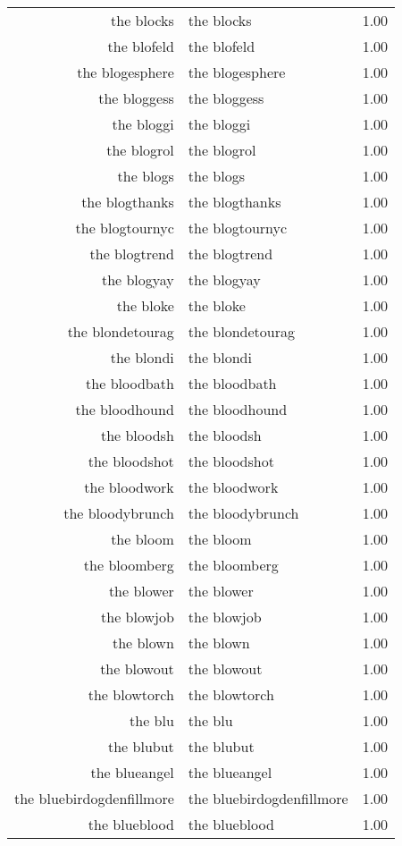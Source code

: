 \begin{table}[ht]
\begin{tabular}{rlr}
  the blocks & the blocks & 1.00 \\ 
  the blofeld & the blofeld & 1.00 \\ 
  the blogesphere & the blogesphere & 1.00 \\ 
  the bloggess & the bloggess & 1.00 \\ 
  the bloggi & the bloggi & 1.00 \\ 
  the blogrol & the blogrol & 1.00 \\ 
  the blogs & the blogs & 1.00 \\ 
  the blogthanks & the blogthanks & 1.00 \\ 
  the blogtournyc & the blogtournyc & 1.00 \\ 
  the blogtrend & the blogtrend & 1.00 \\ 
  the blogyay & the blogyay & 1.00 \\ 
  the bloke & the bloke & 1.00 \\ 
  the blondetourag & the blondetourag & 1.00 \\ 
  the blondi & the blondi & 1.00 \\ 
  the bloodbath & the bloodbath & 1.00 \\ 
  the bloodhound & the bloodhound & 1.00 \\ 
  the bloodsh & the bloodsh & 1.00 \\ 
  the bloodshot & the bloodshot & 1.00 \\ 
  the bloodwork & the bloodwork & 1.00 \\ 
  the bloodybrunch & the bloodybrunch & 1.00 \\ 
  the bloom & the bloom & 1.00 \\ 
  the bloomberg & the bloomberg & 1.00 \\ 
  the blower & the blower & 1.00 \\ 
  the blowjob & the blowjob & 1.00 \\ 
  the blown & the blown & 1.00 \\ 
  the blowout & the blowout & 1.00 \\ 
  the blowtorch & the blowtorch & 1.00 \\ 
  the blu & the blu & 1.00 \\ 
  the blubut & the blubut & 1.00 \\ 
  the blueangel & the blueangel & 1.00 \\ 
  the bluebirdogdenfillmore & the bluebirdogdenfillmore & 1.00 \\ 
  the blueblood & the blueblood & 1.00 \\ 

\end{tabular}
\end{table}
